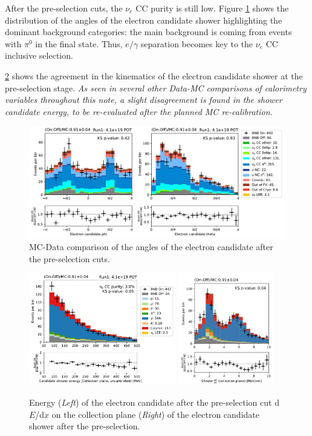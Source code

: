 After the pre-selection cuts, the $\nu_e$ CC purity is still low. Figure \ref{fig:pre_shower_E_pdg} shows the distribution of the angles of the electron candidate shower highlighting the dominant background categories: the main background is coming from events with $\pi^0$ in the final state. Thus, $e/\gamma$ separation becomes key to the $\nu_e$ CC inclusive selection.

\cref{fig:e_cand_Calo} shows the agreement in the kinematics of the electron candidate shower at the pre-selection stage. \emph{As seen in several other Data-MC comparisons of calorimetry variables throughout this note, a slight disagreement is found in the shower candidate energy, to be re-evaluated after the planned MC re-calibration.}


\begin{figure}[h]
    \centering
    \includegraphics[height=4.9cm]{NueCCsel/Images/run1/pre_angles.pdf}
    \caption{MC-Data comparison of the angles of the electron candidate after the pre-selection cuts.}
    \label{fig:pre_shower_E_pdg}
\end{figure}

\begin{figure}[h]
    \centering
     \includegraphics[height=4.9cm]{NueCCsel/Images/run1/pre_shower_E_pdg.pdf}
    \includegraphics[height=4.9cm]{NueCCsel/Images/run1/e_cand_dedxColl}
    \caption{ Energy (\emph{Left}) of the electron candidate after the pre-selection cut d$E$/d$x$ on the collection plane (\emph{Right}) of the electron candidate shower after the pre-selection.}
    \label{fig:e_cand_Calo}
\end{figure}


